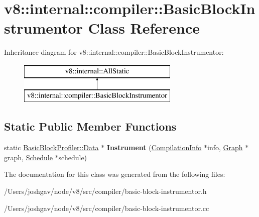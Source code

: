 \hypertarget{classv8_1_1internal_1_1compiler_1_1_basic_block_instrumentor}{}\section{v8\+:\+:internal\+:\+:compiler\+:\+:Basic\+Block\+Instrumentor Class Reference}
\label{classv8_1_1internal_1_1compiler_1_1_basic_block_instrumentor}
Inheritance diagram for v8\+:\+:internal\+:\+:compiler\+:\+:Basic\+Block\+Instrumentor\+:\begin{figure}[H]
\begin{center}
\leavevmode
\includegraphics[height=2.000000cm]{classv8_1_1internal_1_1compiler_1_1_basic_block_instrumentor}
\end{center}
\end{figure}
\subsection*{Static Public Member Functions}
\begin{DoxyCompactItemize}
\item 
static \hyperlink{classv8_1_1internal_1_1_basic_block_profiler_1_1_data}{Basic\+Block\+Profiler\+::\+Data} $\ast$ {\bfseries Instrument} (\hyperlink{classv8_1_1internal_1_1_compilation_info}{Compilation\+Info} $\ast$info, \hyperlink{classv8_1_1internal_1_1compiler_1_1_graph}{Graph} $\ast$graph, \hyperlink{classv8_1_1internal_1_1compiler_1_1_schedule}{Schedule} $\ast$schedule)\hypertarget{classv8_1_1internal_1_1compiler_1_1_basic_block_instrumentor_a123d0e5ef8d89f351f357291392ffc16}{}\label{classv8_1_1internal_1_1compiler_1_1_basic_block_instrumentor_a123d0e5ef8d89f351f357291392ffc16}

\end{DoxyCompactItemize}


The documentation for this class was generated from the following files\+:\begin{DoxyCompactItemize}
\item 
/\+Users/joshgav/node/v8/src/compiler/basic-\/block-\/instrumentor.\+h\item 
/\+Users/joshgav/node/v8/src/compiler/basic-\/block-\/instrumentor.\+cc\end{DoxyCompactItemize}
